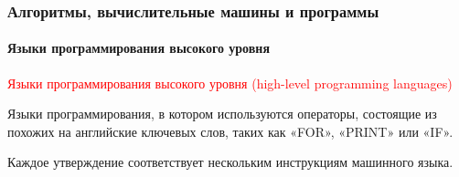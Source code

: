 \documentclass[aspectratio=169]{beamer}
\begin{document}
\begin{frame}
\frametitle{Алгоритмы, вычислительные машины и программы}
\framesubtitle{Языки программирования высокого уровня}
\justifying
\small

\textcolor{red}{Языки программирования высокого уровня (high-level programming languages)}\newline


Языки программирования, в котором используются операторы, состоящие из похожих на английские ключевых слов, таких как «FOR», «PRINT» или «IF».\newline

Каждое утверждение соответствует нескольким инструкциям машинного языка.\newline

\begin{figure}
    \captionsetup[subfigure]{labelformat=empty}
    \centering
\end{figure}
\end{frame}
\end{document}
